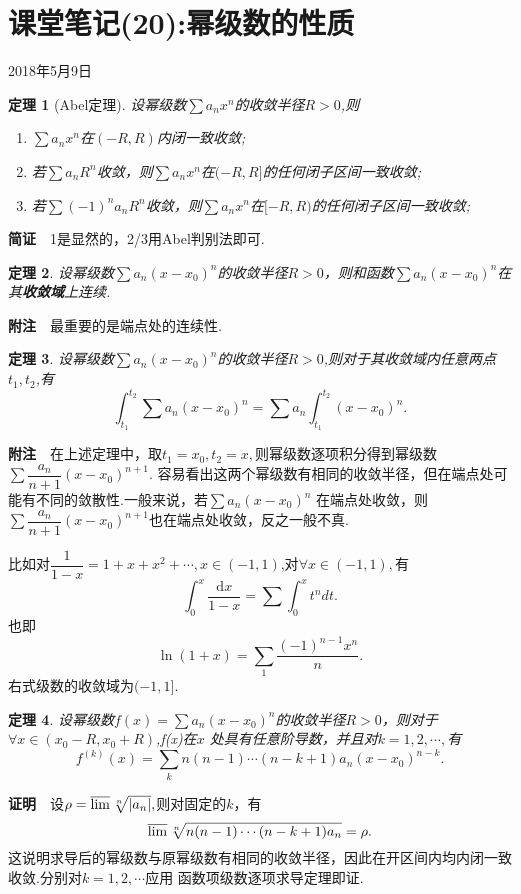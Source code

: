 \documentclass[UTF8]{article}
\newcommand{\dx}{\mathrm{d}x}
\newcommand{\zm}{\textbf{证明}$\quad$}
\newcommand{\jz}{\textbf{简证}$\quad$}
\newcommand{\fz}{\textbf{附注}$\quad$}
\newtheorem{thm}{\hspace{2em}定理}[section]
\begin{document}
\section{课堂笔记(20):幂级数的性质}
\begin{center}
  2018年5月9日
\end{center}
  \begin{thm}[Abel定理]
    设幂级数$\sum a_nx^n$的收敛半径$R>0$,则
    \begin{enumerate}
      \item $\sum a_nx^n$在$(-R,R)$内闭一致收敛;
      \item 若$\sum a_nR^n$收敛，则$\sum a_nx^n$在$(-R,R]$的任何闭子区间一致收敛;
      \item 若$\sum (-1)^na_nR^n$收敛，则$\sum a_nx^n$在$[-R,R)$的任何闭子区间一致收敛;
    \end{enumerate}
  \end{thm}

  \jz 1是显然的，2/3用Abel判别法即可.
  \begin{thm}
    设幂级数$\sum a_n(x-x_0)^n$的收敛半径$R>0$，则和函数$\sum a_n(x-x_0)^n$在其\textbf{收敛域}上连续.
  \end{thm}
  \fz 最重要的是端点处的连续性.
  \begin{thm}
    设幂级数$\sum a_n(x-x_0)^n$的收敛半径$R>0$,则对于其收敛域内任意两点$t_1,t_2$,有
    $$\int_{t_1}^{t_2}\sum a_n(x-x_0)^n=\sum a_n\int_{t_1}^{t_2}(x-x_0)^n.$$
  \end{thm}
  \fz 在上述定理中，取$t_1=x_0,t_2=x,$则幂级数逐项积分得到幂级数$\sum \dfrac{a_n}{n+1}(x-x_0)^{n+1}.$
  容易看出这两个幂级数有相同的收敛半径，但在端点处可能有不同的敛散性.一般来说，若$\sum a_n(x-x_0)^n$
  在端点处收敛，则$\sum \dfrac{a_n}{n+1}(x-x_0)^{n+1}$也在端点处收敛，反之一般不真.

  比如对$\dfrac{1}{1-x}=1+x+x^2+\cdots,x\in(-1,1)$,对$\forall x\in(-1,1),$有
  $$\int_0^x\dfrac{\dx}{1-x}=\sum\int_0^x t^ndt.$$
  也即
  $$\ln(1+x)=\sum_1\dfrac{(-1)^{n-1}x^n}{n}.$$
  右式级数的收敛域为$(-1,1].$
  \begin{thm}
    设幂级数$f(x)=\sum a_n(x-x_0)^n$的收敛半径$R>0$，则对于$\forall x\in(x_0-R,x_0+R)$,f(x)在$x$
    处具有任意阶导数，并且对$k=1,2,\cdots,$有
    $$f^{(k)}(x)=\sum_k n(n-1)\cdots(n-k+1)a_n(x-x_0)^{n-k}.$$
  \end{thm}
  \zm 设$\rho=\varlimsup\sqrt[n]{|a_n|},$则对固定的$k$，有
  $$\varlimsup\sqrt[n]{n(n-1)\cdots(n-k+1)a_n}=\rho.$$
  这说明求导后的幂级数与原幂级数有相同的收敛半径，因此在开区间内均内闭一致收敛.分别对$k=1,2,\cdots$应用
  函数项级数逐项求导定理即证.
\end{document}
